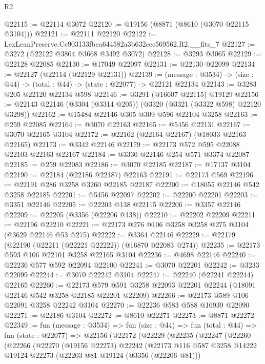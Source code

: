 \begin{lexlean}{R2}
\begin{coremodule}
@22115 := @22114 @3072
@22120 := @19156 (@8871 (@8610 (@3070 @22115 @3104)))
@22121 := @22111 @22120
@22122 := LexLeanPreserve.Cc903133fbea644582a3b632cec569562.R2.__fits_7
@22127 := @3272 (@22122 @3804 @3668 @3492 @3072)
@22128 := @3293 @3065
@22129 := @22128 @22085
@22130 := @17049 @22097
@22131 := @22130 @22099
@22134 := @22127 (@22114 (@22129 @22131))
@22139 := (message : @3534) -> (size : @44) -> (total : @44) -> (state : @22077) -> @22121 @22134
@22143 := @3283 @205 @22120 @22134 @598
@22146 := @3291 (@16607 @22115) @19129
@22156 := @22143 @22146 (@3304 (@3314 @205)) (@3320 (@3321 (@3322 @598) @22120 @3298))
@22162 := @15484 @22146 @305 @309 @596 @22104 @3258
@22163 := @259 @22085
@22164 := @3070 @22163
@22165 := @5456 @22131
@22167 := @3070 @22165 @3104
@22172 := @22162 (@22164 @22167) (@18033 @22163 @22165)
@22173 := @3342 @22146
@22179 := @22173 @572 @595 @22088 @22103 @22163 @22167
@22184 := @3330 @22146 @254 @571 @3374 @22087
@22185 := @259 @22083
@22186 := @3070 @22185
@22187 := @17137 @3104
@22190 := @22184 (@22186 @22187) @22163
@22191 := @22173 @569
@22196 := @22191 @286 @3258 @3260 @22185 @22187
@22200 := @18055 @22146 @542 @3258 @22185
@22201 := @5456 @22097
@22202 := @22200 @22201
@22203 := @3351 @22146
@22205 := @22203 @138 @22115
@22206 := @3357 @22146
@22209 := @22205 (@3356 (@22206 @138))
@22210 := @22202 @22209
@22211 := @22196 @22210
@22221 := @22173 @276 @106 @3258 @3258 @275 @3104 (@3629 @22146 @53 @275)
@22222 := @3364 @22146
@22229 := @22179 (@22190 (@22211 (@22221 @22222)) (@16870 @22083 @274))
@22235 := @22173 @593 @106 @22101 @3258 @22165 @3104
@22236 := @4698 @22146
@22240 := @22236 @577 @592 @22094 @22100
@22241 := @3070 @22201
@22242 := @3233 @22099
@22244 := @3070 @22242 @3104
@22247 := @22240 (@22241 @22244) @22165
@22260 := @22173
    @579
    @591
    @3258
    @22093
    @22201
    @22244
    (@18091 @22146 @542 @3258 @22185 @22201 @22209)
@22266 := @22173 @589 @106 @22091 @3258 @22242 @3104
@22270 := @22236 @583 @588 @16939 @22090
@22271 := @22186 @3104
@22272 := @8610 @22271
@22273 := @8871 @22272
@22349 := fun (message : @3534) =>
  fun (size : @44) =>
  fun (total : @44) =>
  fun (state : @22077) =>
  @22156
    (@22172
      (@22229
        (@22235
          (@22247
            (@22260
              (@22266
                (@22270
                  (@19156 @22273)
                  @22242
                  (@22173
                    @116
                    @587
                    @3258
                    @14222
                    @19124
                    @22273
                    (@22203 @81 @19124 (@3356 (@22206 @81)))

\end{coremodule}
\end{lexlean}
